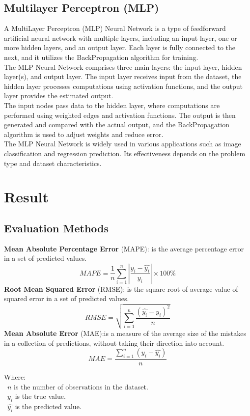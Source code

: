 \documentclass{ieeeojies}
\begin{document}
	\subsection{Multilayer Perceptron (MLP)}
	
	A MultiLayer Perceptron (MLP) Neural Network is a type of feedforward artificial neural network with multiple layers, including an input layer, one or more hidden layers, and an output layer. Each layer is fully connected to the next, and it utilizes the BackPropagation algorithm for training. \\
	The MLP Neural Network comprises three main layers: the input layer, hidden layer(s), and output layer. The input layer receives input from the dataset, the hidden layer processes computations using activation functions, and the output layer provides the estimated output. \\
	The input nodes pass data to the hidden layer, where computations are performed using weighted edges and activation functions. The output is then generated and compared with the actual output, and the BackPropagation algorithm is used to adjust weights and reduce error. \\
	The MLP Neural Network is widely used in various applications such as image classification and regression prediction. Its effectiveness depends on the problem type and dataset characteristics. \cite{b17} \\
	
	
	\section{Result}
	\subsection{Evaluation Methods}
	\textbf{Mean Absolute Percentage Error} (MAPE): is the average percentage error in a set of predicted values. \cite{b18}
	\[MAPE = \frac{1}{n} \sum_{i=1}^n \left| \frac{y_i - \hat{y_i}}{y_i} \right| \times 100\%\]
	\textbf{Root Mean Squared Error} (RMSE): is the square root of average value of squared error in a set of predicted values. \cite{b19}
	\[RMSE=\sqrt{\sum_{i=1}^{n} \frac{(\hat{y_i}-y_i )^2}{n} }\]
	\textbf{Mean Absolute Error} (MAE):is a measure of the average size of the mistakes in a collection of predictions, without taking their direction into account. \cite{b20} \[MAE=\frac{\sum_{i=1}^{n} (y_i - \hat{y_i})}{n}\]
	
	Where: \\
	\indent\textbullet\ \(n\) is the number of observations in the dataset.\\
	\indent\textbullet\ \(y_i\)  is the true value.\\
	\indent\textbullet\ \(\hat{y_i}\) is the predicted value.
	
\end{document}
